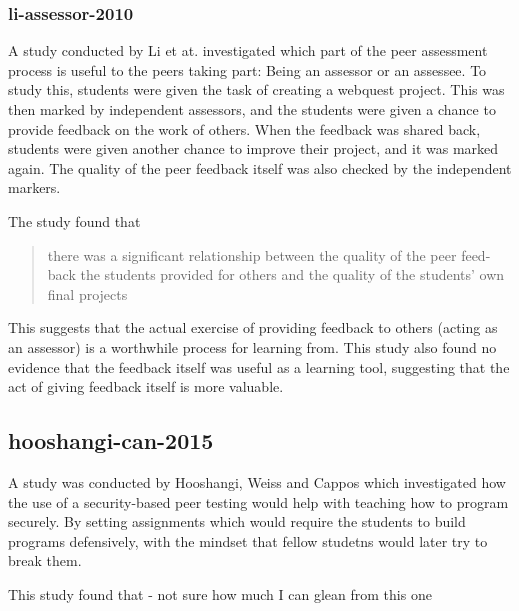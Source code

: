 \documentclass[a4paper,11pt]{report}
\begin{document}
\subsubsection{li-assessor-2010}
A study conducted by Li et at. \cite{li_assessor_2010} investigated which part of the peer assessment process is useful to the peers taking part: Being an assessor or an assessee. To study this, students were given the task of creating a webquest project. This was then marked by independent assessors, and the students were given a chance to provide feedback on the work of others. When the feedback was shared back, students were given another chance to improve their project, and it was marked again. The quality of the peer feedback itself was also checked by the independent markers.\par
The study found that 
\begin{quote}
there was a significant relationship between the quality of the peer feed-back the students provided for others and the quality of the students’ own final projects
\end{quote}
This suggests that the actual exercise of providing feedback to others (acting as an assessor) is a worthwhile process for learning from. This study also found no evidence that the feedback itself was useful as a learning tool, suggesting that the act of giving feedback itself is more valuable.\par

\subsection{hooshangi-can-2015}
A study was conducted by Hooshangi, Weiss and Cappos \cite{hooshangi_can_2015} which investigated how the use of a security-based peer testing would help with teaching how to program securely. By setting assignments which would require the students to build programs defensively, with the mindset that fellow studetns would later try to break them.\par
This study found that  - not sure how much I can glean from this one
\end{document}
